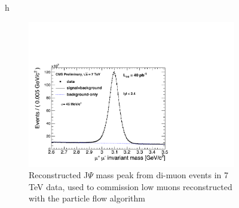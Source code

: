\begin{figure}{h}
    \centering
    \begin{subfigure}[h]{0.40\textwidth}
        \includegraphics[width=\textwidth]{Figures/Reconstruction_Diagrams/MUO__JPsi40pb-1.pdf}
        \caption{Reconstructed J$\Psi$ mass peak from di-muon events
          in 7 TeV data, used to commission low \PT muons reconstructed
        with the particle flow algorithm}\label{fig:muon_jpsi_mass}
      \end{subfigure}
      ~ %
    \begin{subfigure}[h]{0.40\textwidth}

\end{subfigure}
\end{figure}
